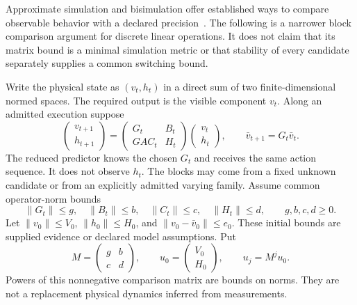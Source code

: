 Approximate simulation and bisimulation offer established ways to compare observable behavior with a declared precision~\cite{GA:girard}. The following is a narrower block comparison argument for discrete linear operations. It does not claim that its matrix bound is a minimal simulation metric or that stability of every candidate separately supplies a common switching bound.

Write the physical state as $(v_t,h_t)$ in a direct sum of two finite-dimensional normed spaces. The required output is the visible component $v_t$. Along an admitted execution suppose
\[
 \begin{pmatrix}v_{t+1}\\h_{t+1}\end{pmatrix}
 =\begin{pmatrix}G_t&B_t\\GAC_t&H_t\end{pmatrix}
  \begin{pmatrix}v_t\\h_t\end{pmatrix},
 \qquad \bar v_{t+1}=G_t\bar v_t. \tag{13}
\]
The reduced predictor knows the chosen $G_t$ and receives the same action sequence. It does not observe $h_t$. The blocks may come from a fixed unknown candidate or from an explicitly admitted varying family. Assume common operator-norm bounds
\[
 \|G_t\|\le g,\quad \|B_t\|\le b,\quad
 \|C_t\|\le c,\quad \|H_t\|\le d,
 \qquad g,b,c,d\ge0.
\]
Let $\|v_0\|\le V_0$, $\|h_0\|\le H_0$, and $\|v_0-\bar v_0\|\le e_0$. These initial bounds are supplied evidence or declared model assumptions. Put
\[
 M=\begin{pmatrix}g&b\\c&d\end{pmatrix},\qquad
 u_0=\begin{pmatrix}V_0\\H_0\end{pmatrix},\qquad u_j=M^ju_0.
\]
Powers of this nonnegative comparison matrix are bounds on norms. They are not a replacement physical dynamics inferred from measurements.

